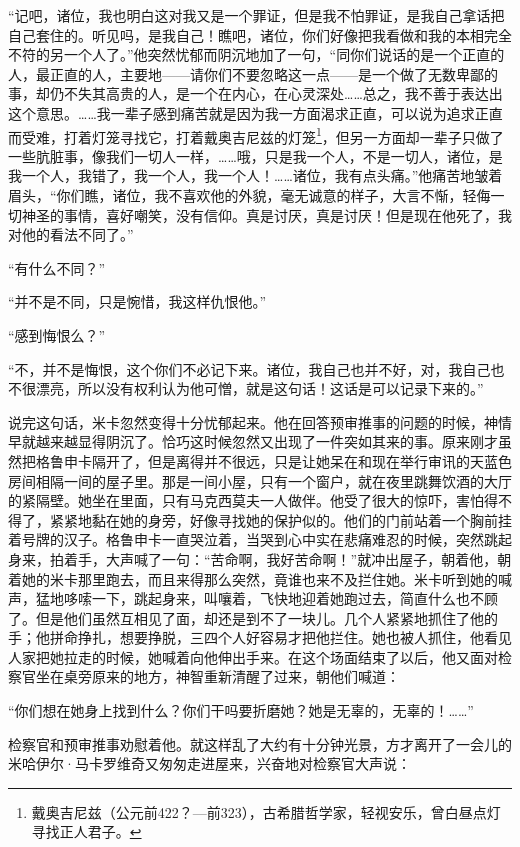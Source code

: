 \par “记吧，诸位，我也明白这对我又是一个罪证，但是我不怕罪证，是我自己拿话把自己套住的。听见吗，是我自己！瞧吧，诸位，你们好像把我看做和我的本相完全不符的另一个人了。”他突然忧郁而阴沉地加了一句，“同你们说话的是一个正直的人，最正直的人，主要地——请你们不要忽略这一点——是一个做了无数卑鄙的事，却仍不失其高贵的人，是一个在内心，在心灵深处……总之，我不善于表达出这个意思。……我一辈子感到痛苦就是因为我一方面渴求正直，可以说为追求正直而受难，打着灯笼寻找它，打着戴奥吉尼兹的灯笼\footnote{戴奥吉尼兹（公元前422？—前323），古希腊哲学家，轻视安乐，曾白昼点灯寻找正人君子。}，但另一方面却一辈子只做了一些肮脏事，像我们一切人一样，……哦，只是我一个人，不是一切人，诸位，是我一个人，我错了，我一个人，我一个人！……诸位，我有点头痛。”他痛苦地皱着眉头，“你们瞧，诸位，我不喜欢他的外貌，毫无诚意的样子，大言不惭，轻侮一切神圣的事情，喜好嘲笑，没有信仰。真是讨厌，真是讨厌！但是现在他死了，我对他的看法不同了。”
\par “有什么不同？”
\par “并不是不同，只是惋惜，我这样仇恨他。”
\par “感到悔恨么？”
\par “不，并不是悔恨，这个你们不必记下来。诸位，我自己也并不好，对，我自己也不很漂亮，所以没有权利认为他可憎，就是这句话！这话是可以记录下来的。”
\par 说完这句话，米卡忽然变得十分忧郁起来。他在回答预审推事的问题的时候，神情早就越来越显得阴沉了。恰巧这时候忽然又出现了一件突如其来的事。原来刚才虽然把格鲁申卡隔开了，但是离得并不很远，只是让她呆在和现在举行审讯的天蓝色房间相隔一间的屋子里。那是一间小屋，只有一个窗户，就在夜里跳舞饮酒的大厅的紧隔壁。她坐在里面，只有马克西莫夫一人做伴。他受了很大的惊吓，害怕得不得了，紧紧地黏在她的身旁，好像寻找她的保护似的。他们的门前站着一个胸前挂着号牌的汉子。格鲁申卡一直哭泣着，当哭到心中实在悲痛难忍的时候，突然跳起身来，拍着手，大声喊了一句：“苦命啊，我好苦命啊！”就冲出屋子，朝着他，朝着她的米卡那里跑去，而且来得那么突然，竟谁也来不及拦住她。米卡听到她的喊声，猛地哆嗦一下，跳起身来，叫嚷着，飞快地迎着她跑过去，简直什么也不顾了。但是他们虽然互相见了面，却还是到不了一块儿。几个人紧紧地抓住了他的手；他拼命挣扎，想要挣脱，三四个人好容易才把他拦住。她也被人抓住，他看见人家把她拉走的时候，她喊着向他伸出手来。在这个场面结束了以后，他又面对检察官坐在桌旁原来的地方，神智重新清醒了过来，朝他们喊道：
\par “你们想在她身上找到什么？你们干吗要折磨她？她是无辜的，无辜的！……”
\par 检察官和预审推事劝慰着他。就这样乱了大约有十分钟光景，方才离开了一会儿的米哈伊尔·马卡罗维奇又匆匆走进屋来，兴奋地对检察官大声说：
